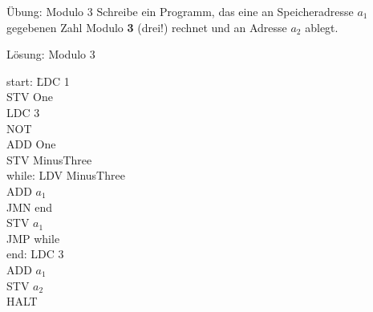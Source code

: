 \begin{frame}{Übung: Modulo 3}
	Schreibe ein Programm, das eine an Speicheradresse $a_1$ gegebenen Zahl Modulo \textbf{3} (drei!) rechnet und an Adresse $a_2$ ablegt.
\end{frame}

\begin{frame}{Lösung: Modulo 3}
  \begin{tabbing}
    start: \quad \= LDC 1 \\
           \> STV One\\
           \> LDC 3\\
           \> NOT\\
           \> ADD One\\
           \> STV MinusThree\\
    \medskip
    while: \> LDV MinusThree\\
           \> ADD $a_1$\\
           \> JMN end\\
           \> STV $a_1$\\
           \> JMP while\\
    \medskip
    end:  \> LDC 3\\
           \> ADD $a_1$\\
           \> STV $a_2$ \\
           \> HALT\\
  \end{tabbing}
\end{frame}
